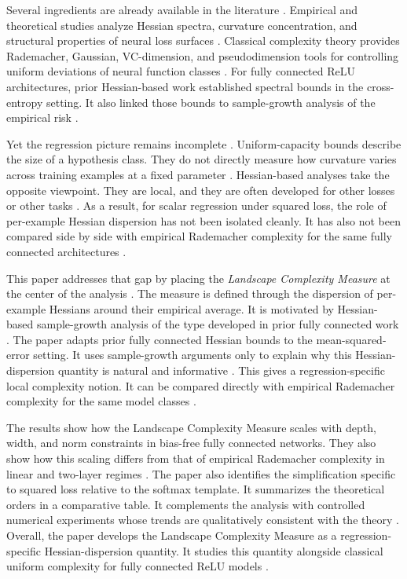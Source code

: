 \documentclass[10pt,letterpaper]{article}
\theoremstyle{definition}
\begin{document}
Several ingredients are already available in the literature \cite{bartlett2002,ghorbani2019,kiselev2024hessian}.
Empirical and theoretical studies analyze Hessian spectra, curvature concentration, and structural properties of neural loss surfaces \cite{ghorbani2019,sagun2018,papyan2019hessian,wu2022dissecting,pennington2017}.
Classical complexity theory provides Rademacher, Gaussian, VC-dimension, and pseudodimension tools for controlling uniform deviations of neural function classes \cite{bartlett2002,vapnik1998,harvey2019jmlr}.
For fully connected ReLU architectures, prior Hessian-based work established spectral bounds in the cross-entropy setting. It also linked those bounds to sample-growth analysis of the empirical risk \cite{kiselev2024hessian}.

Yet the regression picture remains incomplete \cite{bartlett2002,vapnik1998,kiselev2024hessian}.
Uniform-capacity bounds describe the size of a hypothesis class. They do not directly measure how curvature varies across training examples at a fixed parameter \cite{bartlett2002,vapnik1998}.
Hessian-based analyses take the opposite viewpoint. They are local, and they are often developed for other losses or other tasks \cite{kiselev2024hessian,jacot2018ntk,lee2018wide}.
As a result, for scalar regression under squared loss, the role of per-example Hessian dispersion has not been isolated cleanly. It has also not been compared side by side with empirical Rademacher complexity for the same fully connected architectures \cite{bartlett2002,kiselev2024hessian}.

This paper addresses that gap by placing the \emph{Landscape Complexity Measure} at the center of the analysis \cite{kiselev2024hessian}.
The measure is defined through the dispersion of per-example Hessians around their empirical average. It is motivated by Hessian-based sample-growth analysis of the type developed in prior fully connected work \cite{kiselev2024hessian}.
The paper adapts prior fully connected Hessian bounds to the mean-squared-error setting. It uses sample-growth arguments only to explain why this Hessian-dispersion quantity is natural and informative \cite{kiselev2024hessian,skorski2019chain}.
This gives a regression-specific local complexity notion. It can be compared directly with empirical Rademacher complexity for the same model classes \cite{bartlett2002,vapnik1998,kiselev2024hessian}.

The results show how the Landscape Complexity Measure scales with depth, width, and norm constraints in bias-free fully connected networks. They also show how this scaling differs from that of empirical Rademacher complexity in linear and two-layer regimes \cite{bartlett2002,harvey2019jmlr,kiselev2024hessian}.
The paper also identifies the simplification specific to squared loss relative to the softmax template. It summarizes the theoretical orders in a comparative table. It complements the analysis with controlled numerical experiments whose trends are qualitatively consistent with the theory \cite{kiselev2024hessian}.
Overall, the paper develops the Landscape Complexity Measure as a regression-specific Hessian-dispersion quantity. It studies this quantity alongside classical uniform complexity for fully connected ReLU models \cite{bartlett2002,vapnik1998,kiselev2024hessian}.
\end{document}
